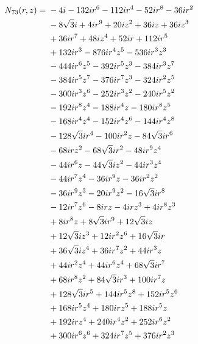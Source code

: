 \documentclass[11pt,a4paper]{article}
\begin{document}
\begin{align}
N_{73}(r,z)={}& - 4 i - 132 i r^{6} - 112 i r^{4} - 52 i r^{8} - 36 i r^{2}\notag\\
& - 8 \sqrt{3} i + 4 i r^{9} + 20 i z^{2} + 36 i z + 36 i z^{3}\notag\\
& + 36 i r^{7} + 48 i z^{4} + 52 i r + 112 i r^{5}\notag\\
& + 132 i r^{3} - 876 i r^{4} z^{5} - 536 i r^{3} z^{3}\notag\\
& - 444 i r^{6} z^{5} - 392 i r^{5} z^{3} - 384 i r^{3} z^{7}\notag\\
& - 384 i r^{5} z^{7} - 376 i r^{7} z^{3} - 324 i r^{2} z^{5}\notag\\
& - 300 i r^{3} z^{6} - 252 i r^{3} z^{2} - 240 i r^{5} z^{2}\notag\\
& - 192 i r^{8} z^{4} - 188 i r^{4} z - 180 i r^{8} z^{5}\notag\\
& - 168 i r^{4} z^{4} - 152 i r^{4} z^{6} - 144 i r^{4} z^{8}\notag\\
& - 128 \sqrt{3} i r^{4} - 100 i r^{2} z - 84 \sqrt{3} i r^{6}\notag\\
& - 68 i r z^{2} - 68 \sqrt{3} i r^{2} - 48 i r^{9} z^{4}\notag\\
& - 44 i r^{6} z - 44 \sqrt{3} i z^{2} - 44 i r^{3} z^{4}\notag\\
& - 44 i r^{7} z^{4} - 36 i r^{9} z - 36 i r^{2} z^{2}\notag\\
& - 36 i r^{9} z^{3} - 20 i r^{9} z^{2} - 16 \sqrt{3} i r^{8}\notag\\
& - 12 i r^{7} z^{6} - 8 i r z - 4 i r z^{3} + 4 i r^{8} z^{3}\notag\\
& + 8 i r^{8} z + 8 \sqrt{3} i r^{9} + 12 \sqrt{3} i z\notag\\
& + 12 \sqrt{3} i z^{3} + 12 i r^{2} z^{6} + 16 \sqrt{3} i r\notag\\
& + 36 \sqrt{3} i z^{4} + 36 i r^{7} z^{2} + 44 i r^{3} z\notag\\
& + 44 i r^{2} z^{4} + 44 i r^{6} z^{4} + 68 \sqrt{3} i r^{7}\notag\\
& + 68 i r^{8} z^{2} + 84 \sqrt{3} i r^{3} + 100 i r^{7} z\notag\\
& + 128 \sqrt{3} i r^{5} + 144 i r^{5} z^{8} + 152 i r^{5} z^{6}\notag\\
& + 168 i r^{5} z^{4} + 180 i r z^{5} + 188 i r^{5} z\notag\\
& + 192 i r z^{4} + 240 i r^{4} z^{2} + 252 i r^{6} z^{2}\notag\\
& + 300 i r^{6} z^{6} + 324 i r^{7} z^{5} + 376 i r^{2} z^{3}\notag\\

\end{align}
\end{document}
